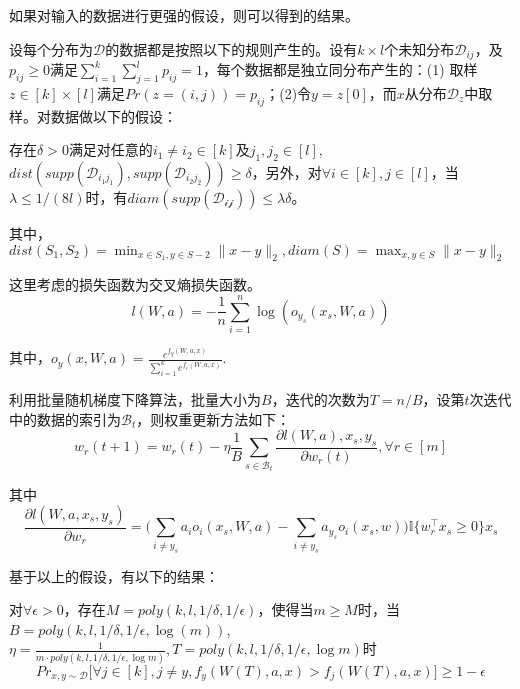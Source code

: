 \par
如果对输入的数据进行更强的假设，则可以得到\citet{li2018learning}的结果。
\par
设每个分布为$\mathcal{D}$的数据都是按照以下的规则产生的。设有$k\times l $个未知分布$\mathcal{D}_{ij}$，及$p_{ij}\geq 0 $满足$\sum_{i=1}^k \sum_{j=1}^l p_{ij} = 1$，每个数据都是独立同分布产生的：(1) 取样$z\in[k]\times [l]$满足$Pr(z = (i,j)) = p_{ij}$；(2)令$y = z[0]$，而$x$从分布$\mathcal{D}_{z}$中取样。对数据做以下的假设：
\begin{assumption}
存在$\delta > 0$满足对任意的$i_1\neq i_2 \in [k]$及$j_1,j_2\in [l]$,$dist(supp(\mathcal{D}_{i_1j_1}),supp(\mathcal{D}_{i_2j_2}))\geq \delta$，另外，对$\forall i\in [k],j\in[l]$，当$\lambda \leq 1/(8l)$时，有$diam(supp(\mathcal{D_{ij}}))\leq \lambda\delta$。
\par
其中，$dist(S_1,S_2) = \min_{x\in S_1, y\in S-2} \|x-y\|_2, diam(S) = \max_{x,y\in S} \|x-y\|_2$
\end{assumption}
\par
这里考虑的损失函数为交叉熵损失函数。
\[
l(W,a) = -\frac{1}{n}\sum_{i=1}^n\log(o_{y_s}(x_s,W,a))
\]
\par
其中，$o_y(x,W,a) = \frac{e^{f_y(W,a,x)}}{\sum_{i=1}^ke^{f_i(W,a,x)}}$.
\par
利用批量随机梯度下降算法，批量大小为$B$，迭代的次数为$T = n/B$，设第$t$次迭代中的数据的索引为$\mathcal{B}_t$，则权重更新方法如下：
\begin{equation}
w_r(t+1) = w_r(t) - \eta\frac{1}{B}\sum_{s\in \mathcal{B}_t}\frac{\partial l(W,a),x_s,y_s}{\partial w_r(t)}, \forall r \in [m]
\end{equation}
\par
其中
\[
\frac{\partial l(W,a,x_s,y_s)}{\partial w_r} = \bigg(\sum_{i\neq y_s }a_i o_i(x_s,W,a)- \sum_{i\neq y_s}a_{y_s}o_i(x_s,w)\bigg)\mathbb{I}\{w_r^\top x_s\geq 0\}x_s
\]
\par
基于以上的假设，有以下的结果：
\begin{theorem}
对$\forall \epsilon > 0$，存在$M = poly(k,l,1/\delta,1/\epsilon)$，使得当$m\geq M$时，当$B = poly(k,l,1/\delta,1/\epsilon,\log(m))$,$\eta = \frac{1}{m\cdot poly(k,l,1/\delta,1/\epsilon,\log m)}, T = poly(k,l,1/\delta,1/\epsilon,\log m)$时
\[
Pr_{x,y\sim \mathcal{D}}\big[\forall j \in [k], j\neq y, f_y(W(T),a,x)>f_j(W(T),a,x)\big]\geq 1-\epsilon
\]
\end{theorem}

